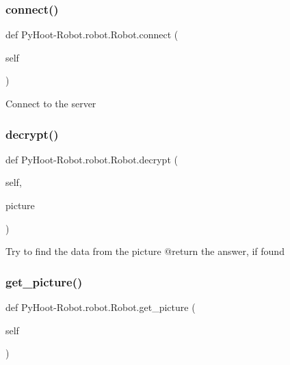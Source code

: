 \subsubsection{\texorpdfstring{connect()}{connect()}}
{\footnotesize\ttfamily def Py\+Hoot-\/Robot.\+robot.\+Robot.\+connect (\begin{DoxyParamCaption}\item[{}]{self }\end{DoxyParamCaption})}

\begin{DoxyVerb}Connect to the server\end{DoxyVerb}
 \mbox{\label{class_py_hoot-_robot_1_1robot_1_1_robot_ae2a9fb148958a87b595aef8d58b1feb6}} 
\subsubsection{\texorpdfstring{decrypt()}{decrypt()}}
{\footnotesize\ttfamily def Py\+Hoot-\/Robot.\+robot.\+Robot.\+decrypt (\begin{DoxyParamCaption}\item[{}]{self,  }\item[{}]{picture }\end{DoxyParamCaption})}

\begin{DoxyVerb}Try to find the data from the picture
@return the answer, if found\end{DoxyVerb}
 \mbox{\label{class_py_hoot-_robot_1_1robot_1_1_robot_a04c483af242edbf980b28cf758a8ce35}} 
\subsubsection{\texorpdfstring{get\+\_\+picture()}{get\_picture()}}
{\footnotesize\ttfamily def Py\+Hoot-\/Robot.\+robot.\+Robot.\+get\+\_\+picture (\begin{DoxyParamCaption}\item[{}]{self }\end{DoxyParamCaption})}

